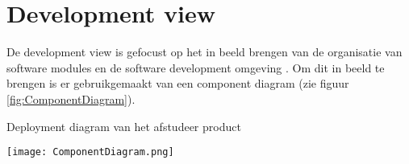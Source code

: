 \section{Development view}
De development view is gefocust op het in beeld brengen van de organisatie van software modules en de software development omgeving \parencite{4p1Model}.
Om dit in beeld te brengen is er gebruikgemaakt van een component diagram (zie figuur \ref{fig:ComponentDiagram}).


\whitespace[2]
\begin{graphic}
    \captionsetup{type=figure}
    \caption{Deployment diagram van het afstudeer product}
    \texttt{[image: ComponentDiagram.png]}
    \label{fig:ComponentDiagram}
\end{graphic}

